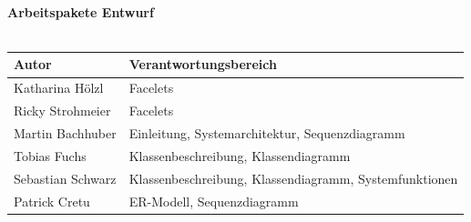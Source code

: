 \documentclass[a4paper, 12pt]{scrreprt}
\begin{document}
\begin{titlepage}
\begin{center}
        \ \\
        \ \\
        \hspace{3 cm}\\
        \textbf{Arbeitspakete Entwurf} \\
        \ \\
        
        \begin{tabular}{ | l | l |}
        	\hline
        	\textbf{Autor} & \textbf{Verantwortungsbereich} \\ \hline
        	Katharina Hölzl & Facelets  \\ \hline
        	Ricky Strohmeier& Facelets  \\ \hline
        	Martin Bachhuber & Einleitung, Systemarchitektur, Sequenzdiagramm  \\ \hline
        	Tobias Fuchs & Klassenbeschreibung, Klassendiagramm \\ \hline
        	Sebastian Schwarz & Klassenbeschreibung, Klassendiagramm, Systemfunktionen \\ \hline  
        	Patrick Cretu  &  ER-Modell, Sequenzdiagramm  \\ \hline
        \end{tabular}
        
    \end{center}
\end{titlepage}



\tableofcontents








\end{document}
